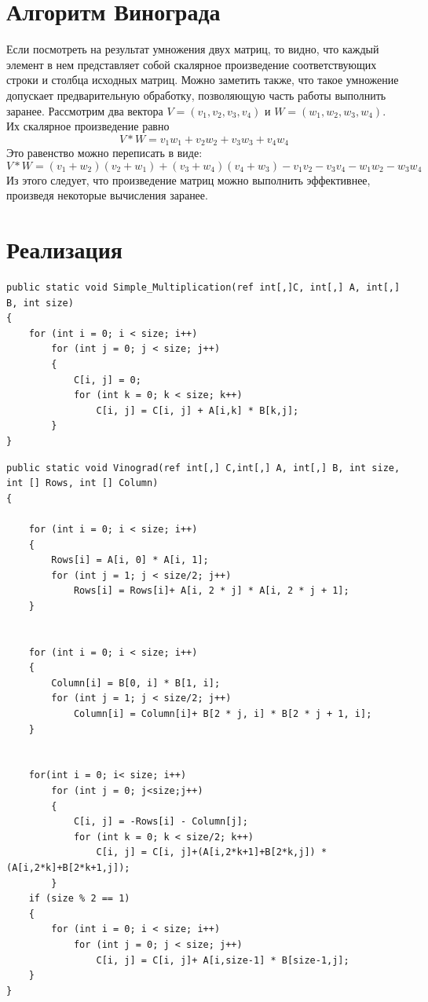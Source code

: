 \documentclass[a4paper,12pt]{article}
\begin{document}
\section{Алгоритм Винограда}
	Если посмотреть на результат умножения двух матриц, то видно, что каждый элемент в нем представляет собой скалярное произведение соответствующих строки и столбца исходных матриц. Можно заметить также, что такое умножение допускает предварительную обработку, позволяющую часть работы выполнить заранее. Рассмотрим два вектора $V = (v_1,v_2,v_3,v_4)$ и $W = (w_1,w_2,w_3,w_4)$. Их скалярное произведение равно 
	\begin{equation}
		V*W = v_1w_1 + v_2w_2 + v_3w_3 + v_4w_4
	\end{equation}
	Это равенство можно переписать в виде:
	\begin{equation}
	V*W = (v_1+w_2)(v_2+w_1)+(v_3+w_4)(v_4+w_3)-v_1v_2-v_3v_4-w_1w_2-w_3w_4
	\end{equation}
	Из этого следует, что произведение матриц можно выполнить эффективнее, произведя некоторые вычисления заранее.
	
    
\section{Реализация}
\begin{lstlisting}[label=some-code,caption={Стандартный алгоритм умножения матриц}]
public static void Simple_Multiplication(ref int[,]C, int[,] A, int[,] B, int size)
{
	for (int i = 0; i < size; i++)
		for (int j = 0; j < size; j++)
		{
			C[i, j] = 0;
			for (int k = 0; k < size; k++)
				C[i, j] = C[i, j] + A[i,k] * B[k,j];
		}
}
\end{lstlisting}

\begin{lstlisting}[label=some-code1,caption={Алгоритм Винограда}]
public static void Vinograd(ref int[,] C,int[,] A, int[,] B, int size, int [] Rows, int [] Column)
{
	
	for (int i = 0; i < size; i++)
	{
		Rows[i] = A[i, 0] * A[i, 1];
		for (int j = 1; j < size/2; j++)
			Rows[i] = Rows[i]+ A[i, 2 * j] * A[i, 2 * j + 1];
	}
	
	
	for (int i = 0; i < size; i++)
	{
		Column[i] = B[0, i] * B[1, i];
		for (int j = 1; j < size/2; j++)
			Column[i] = Column[i]+ B[2 * j, i] * B[2 * j + 1, i];
	}
	
	
	for(int i = 0; i< size; i++)
		for (int j = 0; j<size;j++)
		{
			C[i, j] = -Rows[i] - Column[j];
			for (int k = 0; k < size/2; k++)
				C[i, j] = C[i, j]+(A[i,2*k+1]+B[2*k,j]) * (A[i,2*k]+B[2*k+1,j]);
		}
	if (size % 2 == 1)
	{
		for (int i = 0; i < size; i++)
			for (int j = 0; j < size; j++)
				C[i, j] = C[i, j]+ A[i,size-1] * B[size-1,j];
	}
}
\end{lstlisting}
\end{document}
